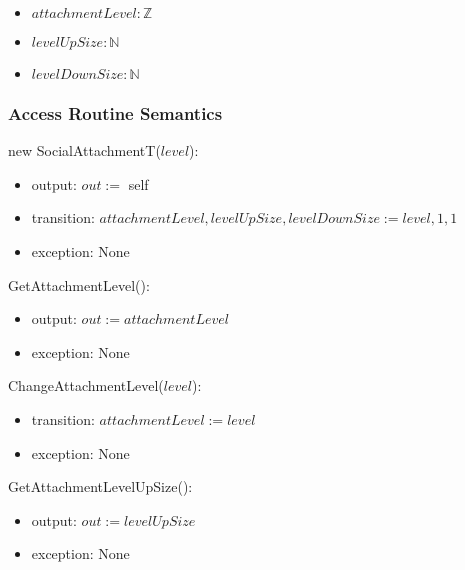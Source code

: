 \begin{itemize}

    \item $ \mathit{attachmentLevel} : \mathbb{Z} $

    \item $ \mathit{levelUpSize} : \mathbb{N} $

    \item $ \mathit{levelDownSize} : \mathbb{N} $

\end{itemize}

\clearpage\subsubsection{Access Routine Semantics}

\noindent new SocialAttachmentT($\mathit{level}$):
\begin{itemize}

    \item output: $out :=$ self

    \item transition: $ \mathit{attachmentLevel}, \mathit{levelUpSize},
    \mathit{levelDownSize} := \mathit{level}, 1, 1 $

    \item exception: None

\end{itemize}

\noindent GetAttachmentLevel():
\begin{itemize}

    \item output: $out := \mathit{attachmentLevel} $

    \item exception: None

\end{itemize}

\noindent ChangeAttachmentLevel($\mathit{level}$):
\begin{itemize}

    \item transition: $\mathit{attachmentLevel} := \mathit{level} $

    \item exception: None

\end{itemize}

\noindent GetAttachmentLevelUpSize():
\begin{itemize}

    \item output: $out := \mathit{levelUpSize} $

    \item exception: None

\end{itemize}

